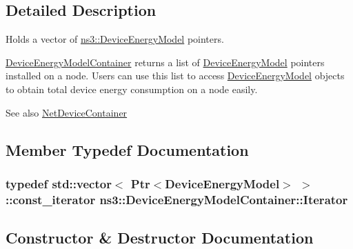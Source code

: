 \subsection{Detailed Description}
Holds a vector of \hyperlink{classns3_1_1DeviceEnergyModel}{ns3\+::\+Device\+Energy\+Model} pointers. 

\hyperlink{classns3_1_1DeviceEnergyModelContainer}{Device\+Energy\+Model\+Container} returns a list of \hyperlink{classns3_1_1DeviceEnergyModel}{Device\+Energy\+Model} pointers installed on a node. Users can use this list to access \hyperlink{classns3_1_1DeviceEnergyModel}{Device\+Energy\+Model} objects to obtain total device energy consumption on a node easily.

\begin{DoxySeeAlso}{See also}
\hyperlink{classns3_1_1NetDeviceContainer}{Net\+Device\+Container} 
\end{DoxySeeAlso}


\subsection{Member Typedef Documentation}
\subsubsection[{\texorpdfstring{Iterator}{Iterator}}]{\setlength{\rightskip}{0pt plus 5cm}typedef std\+::vector$<$ {\bf Ptr}$<${\bf Device\+Energy\+Model}$>$ $>$\+::const\+\_\+iterator {\bf ns3\+::\+Device\+Energy\+Model\+Container\+::\+Iterator}}\hypertarget{classns3_1_1DeviceEnergyModelContainer_a7e8b57fa36903db5c468cc8a8e00af3b}{}\label{classns3_1_1DeviceEnergyModelContainer_a7e8b57fa36903db5c468cc8a8e00af3b}


\subsection{Constructor \& Destructor Documentation}
